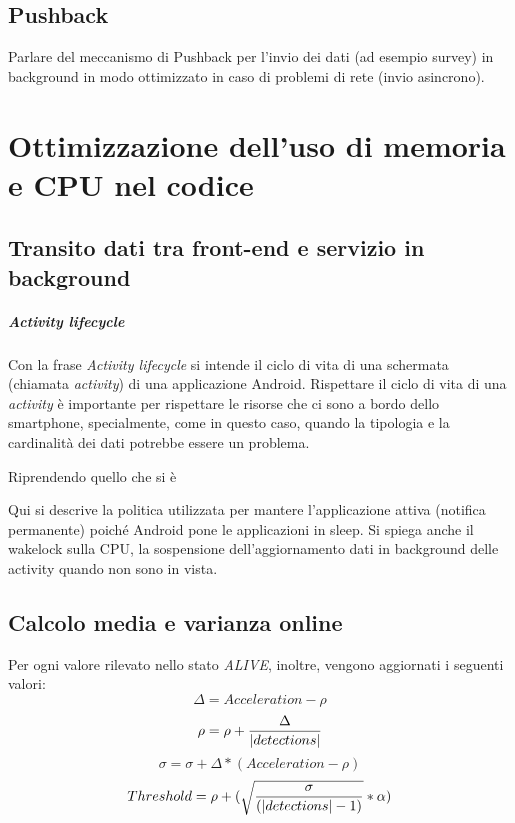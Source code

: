 \documentclass[a4paper,10pt]{memoir}
\begin{document}
\pagebreak

\section{Pushback}

Parlare del meccanismo di Pushback per l'invio dei dati (ad esempio survey) in background in modo ottimizzato in caso di problemi di rete (invio asincrono).

\chapter{Ottimizzazione dell'uso di memoria e CPU nel codice}

\section{Transito dati tra front-end e servizio in background}

\paragraph{Activity lifecycle} Con la frase \textit{Activity lifecycle} si intende il ciclo di vita di una schermata (chiamata \textit{activity}) di una applicazione Android. Rispettare il ciclo di vita di una \textit{activity} è importante per rispettare le risorse che ci sono a bordo dello smartphone, specialmente, come in questo caso, quando la tipologia e la cardinalità dei dati potrebbe essere un problema.

Riprendendo quello che si è

Qui si descrive la politica utilizzata per mantere l'applicazione attiva (notifica permanente) poiché Android pone le applicazioni in sleep. Si spiega anche il wakelock sulla CPU, la sospensione dell'aggiornamento dati in background delle activity quando non sono in vista.

\section{Calcolo media e varianza online}

Per ogni valore rilevato nello stato \textit{ALIVE}, inoltre, vengono aggiornati i seguenti valori:
\begin{equation}
\Delta = Acceleration - \rho
\end{equation}
\begin{equation}
\rho = \rho + {\Delta \over |detections|}
\end{equation}
\begin{equation}
\sigma = \sigma + \Delta * (Acceleration - \rho)
\end{equation}
\begin{equation}
Threshold = \rho + (\sqrt{\sigma \over (|detections|-1)} * \alpha)
\end{equation}
\end{document}
